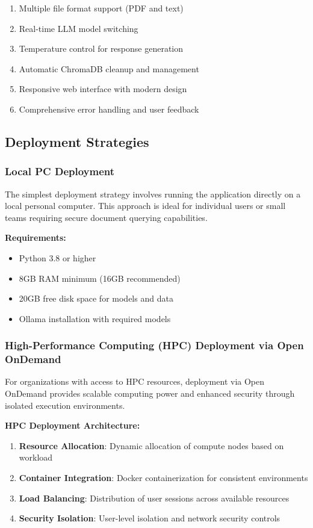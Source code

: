 \documentclass[12pt,letterpaper]{article}
\begin{document}
\begin{enumerate}
    \item Multiple file format support (PDF and text)
    \item Real-time LLM model switching
    \item Temperature control for response generation
    \item Automatic ChromaDB cleanup and management
    \item Responsive web interface with modern design
    \item Comprehensive error handling and user feedback
\end{enumerate}

\subsection{Deployment Strategies}

\subsubsection{Local PC Deployment}

The simplest deployment strategy involves running the application directly on a local personal computer. This approach is ideal for individual users or small teams requiring secure document querying capabilities.

\textbf{Requirements:}
\begin{itemize}
    \item Python 3.8 or higher
    \item 8GB RAM minimum (16GB recommended)
    \item 20GB free disk space for models and data
    \item Ollama installation with required models
\end{itemize}

\subsubsection{High-Performance Computing (HPC) Deployment via Open OnDemand}

For organizations with access to HPC resources, deployment via Open OnDemand provides scalable computing power and enhanced security through isolated execution environments.

\textbf{HPC Deployment Architecture:}
\begin{enumerate}
    \item \textbf{Resource Allocation}: Dynamic allocation of compute nodes based on workload
    \item \textbf{Container Integration}: Docker containerization for consistent environments
    \item \textbf{Load Balancing}: Distribution of user sessions across available resources
    \item \textbf{Security Isolation}: User-level isolation and network security controls
\end{enumerate}
\end{document}
